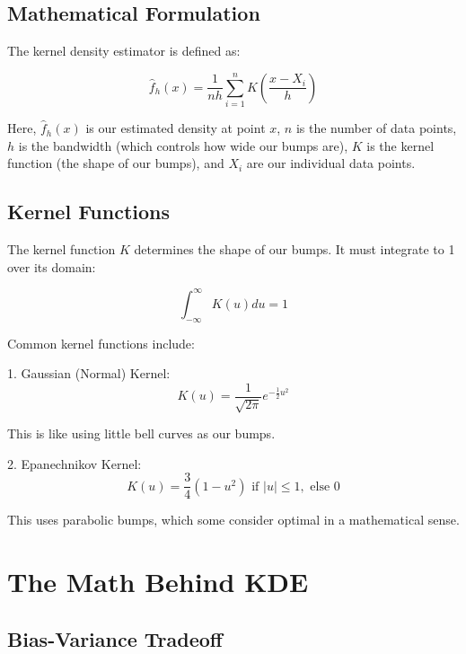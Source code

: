 \documentclass[conference]{IEEEtran}
\begin{document}
\subsection{Mathematical Formulation}

The kernel density estimator is defined as:

\begin{equation}
    \hat{f}_h(x) = \frac{1}{nh} \sum_{i=1}^n K\left(\frac{x - X_i}{h}\right)
\end{equation}

Here, $\hat{f}_h(x)$ is our estimated density at point $x$, $n$ is the number of data points, $h$ is the bandwidth (which controls how wide our bumps are), $K$ is the kernel function (the shape of our bumps), and $X_i$ are our individual data points.

\subsection{Kernel Functions}

The kernel function $K$ determines the shape of our bumps. It must integrate to 1 over its domain:

\begin{equation}
    \int_{-\infty}^{\infty} K(u) du = 1
\end{equation}

Common kernel functions include:

1. Gaussian (Normal) Kernel:
\begin{equation}
    K(u) = \frac{1}{\sqrt{2\pi}} e^{-\frac{1}{2}u^2}
\end{equation}

This is like using little bell curves as our bumps.

2. Epanechnikov Kernel:
\begin{equation}
    K(u) = \frac{3}{4}(1-u^2) \text{ if } |u|\leq 1, \text{ else } 0
\end{equation}

This uses parabolic bumps, which some consider optimal in a mathematical sense.

\section{The Math Behind KDE}

\subsection{Bias-Variance Tradeoff}
\end{document}
